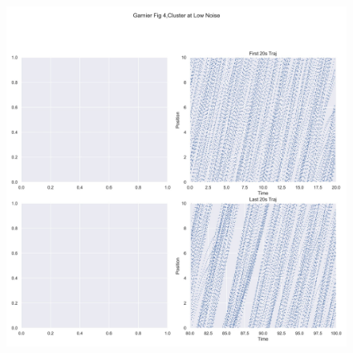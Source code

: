 \documentclass[11pt,a4paper, final, dvipsnames]{article}
\begin{document}
\begin{figure}
    \centering
    \begin{minipage}[b]{\textwidth}
        \centering
        
        \includegraphics[width=\textwidth]{GarnierFigure41}
    \end{minipage} \\
    

\end{figure}
\end{document}
